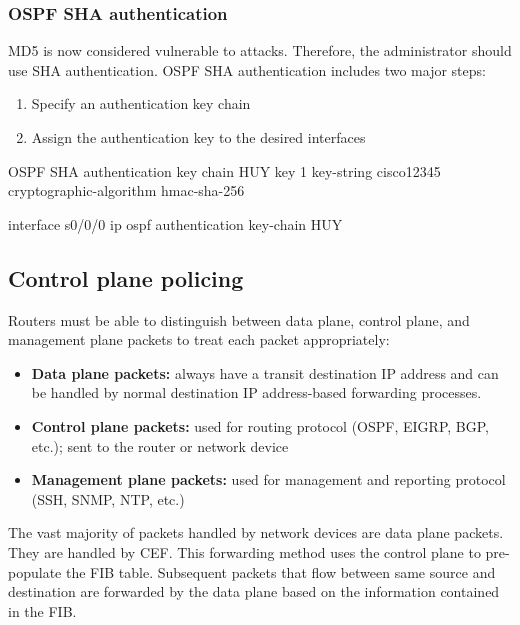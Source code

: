 \subsubsection{OSPF SHA authentication}

MD5 is now considered vulnerable to attacks. Therefore, the administrator should use SHA authentication. OSPF SHA authentication includes two major steps:

\begin{enumerate}
\item Specify an authentication key chain
\item Assign the authentication key to the desired interfaces 
\end{enumerate}

\begin{sexylisting}{OSPF SHA authentication}
key chain HUY
  key 1
  key-string cisco12345
  cryptographic-algorithm hmac-sha-256
  
interface s0/0/0
  ip ospf authentication key-chain HUY
\end{sexylisting}

\subsection{Control plane policing}

Routers must be able to distinguish between data plane, control plane, and management plane packets to treat each packet appropriately:

\begin{itemize}
\item \textbf{Data plane packets:} always have a transit destination IP address and can be handled by normal destination IP address-based forwarding processes.
\item \textbf{Control plane packets:} used for routing protocol (OSPF, EIGRP, BGP, etc.); sent to the router or network device
\item \textbf{Management plane packets:} used for management and reporting protocol (SSH, SNMP, NTP, etc.)
\end{itemize}

The vast majority of packets handled by network devices are data plane packets. They are handled by CEF. This forwarding method uses the control plane to pre-populate the FIB table. Subsequent packets that flow between same source and destination are forwarded by the data plane based on the information contained in the FIB.
%
